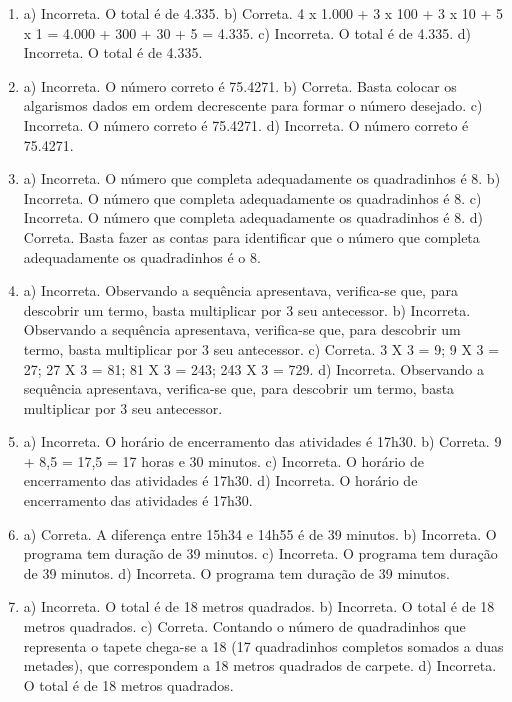 \begin{enumerate}
\item
a) Incorreta. O total é de 4.335. 
b) Correta. 4 x 1.000 + 3 x 100 + 3 x 10 + 5 x 1 = 
4.000 + 300 + 30 + 5 = 4.335.
c) Incorreta. O total é de 4.335. 
d) Incorreta. O total é de 4.335. 

\item
a) Incorreta. O número correto é 75.4271.
b) Correta. Basta colocar os algarismos dados em ordem decrescente para
formar o número desejado.
c) Incorreta. O número correto é 75.4271.
d) Incorreta. O número correto é 75.4271.

\item
a) Incorreta. O número que completa adequadamente os quadradinhos é 8.
b) Incorreta. O número que completa adequadamente os quadradinhos é 8.
c) Incorreta. O número que completa adequadamente os quadradinhos é 8.
d) Correta. Basta fazer as contas para identificar que o número que
completa adequadamente os quadradinhos é o 8.

\item
a) Incorreta. Observando a sequência apresentava, verifica-se que,
para descobrir um termo, basta multiplicar por 3 seu antecessor. 
b) Incorreta. Observando a sequência apresentava, verifica-se que,
para descobrir um termo, basta multiplicar por 3 seu antecessor. 
c) Correta. 3 X 3 = 9; 9 X 3 = 27; 27 X 3 = 81; 81 X 3 = 243; 
243 X 3 = 729. 
d) Incorreta. Observando a sequência apresentava, verifica-se que,
para descobrir um termo, basta multiplicar por 3 seu antecessor.

\item
a) Incorreta. O horário de encerramento das atividades é 17h30.
b) Correta. 9 + 8,5 = 17,5 = 17 horas e 30 minutos.
c) Incorreta. O horário de encerramento das atividades é 17h30.
d) Incorreta. O horário de encerramento das atividades é 17h30.

\item
a) Correta. A diferença entre 15h34 e 14h55 é de 39 minutos.
b) Incorreta. O programa tem duração de 39 minutos.
c) Incorreta. O programa tem duração de 39 minutos.
d) Incorreta. O programa tem duração de 39 minutos.

\item
a) Incorreta. O total é de 18 metros quadrados.
b) Incorreta. O total é de 18 metros quadrados.
c) Correta. Contando o número de quadradinhos que representa o tapete
chega-se a 18 (17 quadradinhos completos somados a duas metades), que
correspondem a 18 metros quadrados de carpete.
d) Incorreta. O total é de 18 metros quadrados.


\end{enumerate}
